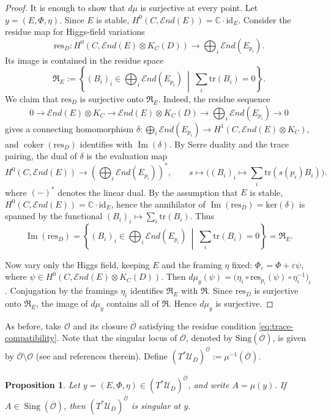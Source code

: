 \documentclass[11pt]{amsart}
\theoremstyle{plain}
\newtheorem{proposition}[theorem]{Proposition}
\theoremstyle{definition}
\theoremstyle{remark}
\newcommand{\C}{\mathbb C}
\newcommand{\End}{\mathcal E nd}
\newcommand{\id}{\mathrm{id}}
\newcommand{\ov}[1]{\overline{#1}}
\newcommand{\cO}{\mathcal O}
\newcommand{\tr}{\mathrm{tr}}
\def\C{\mathbb{C}}
\def\ker{\textrm{ker}}
\def\res{\mathrm{res}}
\begin{document}
\begin{proof}
	It is enough to show that $d\mu$ is surjective at every point. Let
	$y=(E,\Phi,\eta)$. Since $E$ is stable, $H^0(C,\End(E))=\C\cdot\id_E$. Consider the residue map for Higgs-field variations
	\[
	\res_D:
	H^0(C,\End(E)\otimes K_C(D))
	\longrightarrow
	\bigoplus_i\End(E_{p_i}).
	\]
	Its image is contained in the  residue space
	\[
	\mathfrak R_E:=
	\left\{
	(B_i)_i\in\bigoplus_i\End(E_{p_i})
	\ \middle|\
	\sum_i\tr(B_i)=0
	\right\}.
	\]
	We claim that $\res_D$ is surjective onto $\mathfrak R_E$. Indeed, the residue sequence
	\[
	0\to\End(E)\otimes K_C
	\to\End(E)\otimes K_C(D)
	\to \bigoplus_i\End(E_{p_i}) \to 0
	\]
	gives a connecting homomorphism $\delta:\bigoplus_i\End(E_{p_i})
	\longrightarrow H^1(C,\End(E)\otimes K_C)$,
	and $\operatorname{coker}(\res_D)$ identifies with $\operatorname{Im}(\delta)$.
	By Serre duality and the trace pairing, the dual of $\delta$ is the evaluation
	map
	\[
	H^0(C,\End(E))
	\longrightarrow
	\left(\bigoplus_i\End(E_{p_i})\right)^*,
	\qquad
	s\longmapsto \bigl((B_i)_i\mapsto \sum_i\tr(s(p_i)B_i)\bigr).
	\]
    where $(-)^*$ denotes the linear dual. By the assumption that $E$ is stable, $H^0(C,\End(E))=\C\cdot\id_E$, hence the annihilator of
	$\operatorname{Im}(\res_D)=\ker(\delta)$ is spanned by the functional $(B_i)_i\longmapsto \sum_i\tr(B_i)$. Thus
	\[
	\operatorname{Im}(\res_D)
	=
	\left\{
	(B_i)_i\in\bigoplus_i\End(E_{p_i})
	\ \middle|\
	\sum_i\tr(B_i)=0
	\right\}
	=\mathfrak R_E.
	\]

	Now vary only the Higgs field, keeping $E$ and the framing $\eta$ fixed:
	$\Phi_\varepsilon=\Phi+\varepsilon\psi$, where
	$\psi\in H^0(C,\End(E)\otimes K_C(D))$. Then $
	d\mu_y(\psi)
	=
	\bigl(\eta_i\circ\res_{p_i}(\psi)\circ\eta_i^{-1}\bigr)_i$. Conjugation by the framings $\eta_i$ identifies $\mathfrak R_E$ with
	$\mathfrak R$. Since $\res_D$ is surjective onto $\mathfrak R_E$, the image of
	$d\mu_y$ contains all of $\mathfrak R$. Hence $d\mu_y$ is surjective.
\end{proof}
As before, take $\cO$ and its closure $\ov\cO$ satisfying the residue condition \eqref{eq:trace-compatibility}. Note that the singular locus of $\ov\cO$, denoted by $\mathrm{Sing}(\ov\cO)$, is given by $\ov\cO \setminus \cO$ (see \cite{kaledinsingularity, namikawa2005birationalgeometrysymplecticresolutions, FuSingularity} and references therein). Define
$(T^*\mathcal U_D)^{\ov\cO}:=\mu^{-1}(\ov\cO)$.

\begin{proposition}\label{prop:singularity-criterion}
	Let $y=(E,\Phi,\eta)\in (T^*\mathcal U_D)^{\ov\cO}$, and write $A=\mu(y)$. If $A\in\operatorname{Sing}(\ov\cO)$, then $(T^*\mathcal U_D)^{\ov\cO}$ is singular at $y$.
\end{proposition}
\end{document}
